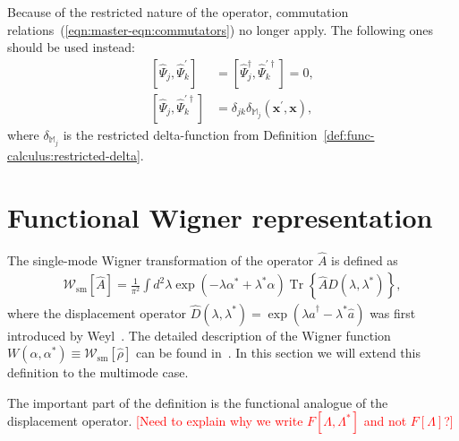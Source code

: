 \documentclass[12pt,aip,jmp,amssymb,amsmath]{revtex4-1}
\newcommand{\todo}[1]{\textcolor{red}{[#1]}}
\newcommand{\xvec}{\boldsymbol{x}}
\newcommand{\Trace}[1]{\operatorname{Tr} \left\{ #1 \right\}}
\newcommand{\Psiop}{\hat{\Psi}}
\newcommand{\restbasis}{\mathbb{M}}
\newcommand{\eqnref}[1]{(\ref{eqn:#1})}
\newcommand{\defref}[1]{Definition~\ref{def:#1}}
\begin{document}
Because of the restricted nature of the operator, commutation relations~\eqnref{master-eqn:commutators} no longer apply.
The following ones should be used instead:
\begin{equation}\begin{split}
\label{eqn:func-operators:restricted-commutators}
    \left[ \Psiop_j, \Psiop_k^\prime \right]
    & = \left[ \Psiop_j^\dagger, \Psiop_k^{\prime\dagger} \right] = 0, \\
    \left[ \Psiop_j, \Psiop_k^{\prime\dagger} \right]
    & = \delta_{jk} \delta_{\restbasis_j}(\xvec^\prime, \xvec),
\end{split}\end{equation}
where $\delta_{\restbasis_j}$ is the restricted delta-function from \defref{func-calculus:restricted-delta}.



\section{Functional Wigner representation}

The single-mode Wigner transformation of the operator $\hat{A}$ is defined as
\begin{equation}\begin{split}
    \mathcal{W}_{\mathrm{sm}}[\hat{A}]
    = \frac{1}{\pi^2} \int d^2 \lambda \exp(-\lambda \alpha^* + \lambda^* \alpha)
        \Trace{ \hat{A} \hat{D}(\lambda, \lambda^*) },
\end{split}\end{equation}
where the displacement operator $\hat{D}(\lambda, \lambda^*) = \exp(\lambda \hat{a}^\dagger - \lambda^* \hat{a})$ was first introduced by Weyl~\cite{Weyl1950}.
The detailed description of the Wigner function $W(\alpha, \alpha^*) \equiv \mathcal{W}_{\mathrm{sm}}[\hat{\rho}]$ can be found in~\cite{Gardiner2004}.
In this section we will extend this definition to the multimode case.

The important part of the definition is the functional analogue of the displacement operator.
\todo{Need to explain why we write $F[\Lambda, \Lambda^*]$ and not $F[\Lambda]$?}
\end{document}
